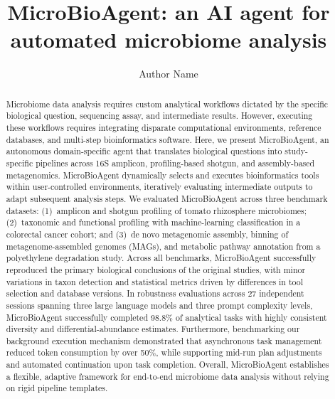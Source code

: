 \documentclass[11pt,a4paper]{article}
\title{MicroBioAgent: an AI agent for automated microbiome analysis}
\author{Author Name}
\date{}
\begin{document}
\maketitle

\begin{abstract}
Microbiome data analysis requires custom analytical workflows dictated by the
specific biological question, sequencing assay, and intermediate results.
However, executing these workflows requires integrating disparate computational
environments, reference databases, and multi-step bioinformatics software.
Here, we present MicroBioAgent, an autonomous domain-specific agent that
translates biological questions into study-specific pipelines across 16S
amplicon, profiling-based shotgun, and assembly-based metagenomics.
MicroBioAgent dynamically selects and executes bioinformatics tools within
user-controlled environments, iteratively evaluating intermediate outputs to
adapt subsequent analysis steps.
We evaluated MicroBioAgent across three benchmark datasets: (1)~amplicon and
shotgun profiling of tomato rhizosphere microbiomes; (2)~taxonomic and
functional profiling with machine-learning classification in a colorectal
cancer cohort; and (3)~de novo metagenomic assembly, binning of
metagenome-assembled genomes (MAGs), and metabolic pathway annotation from a
polyethylene degradation study.  Across all benchmarks, MicroBioAgent
successfully reproduced the primary biological conclusions of the original
studies, with minor variations in taxon detection and statistical metrics
driven by differences in tool selection and database versions.
In robustness evaluations across 27 independent sessions spanning three large
language models and three prompt complexity levels, MicroBioAgent successfully
completed 98.8\% of analytical tasks with highly consistent diversity and
differential-abundance estimates.  Furthermore, benchmarking our background
execution mechanism demonstrated that asynchronous task management reduced
token consumption by over 50\%, while supporting mid-run plan adjustments and
automated continuation upon task completion.  Overall, MicroBioAgent
establishes a flexible, adaptive framework for end-to-end microbiome data
analysis without relying on rigid pipeline templates.
\end{abstract}
\end{document}
